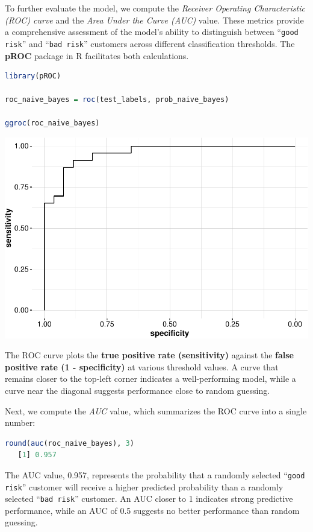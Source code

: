 \documentclass[
]{book}
\newcommand{\passthrough}[1]{#1}
\theoremstyle{definition}
\theoremstyle{definition}
\theoremstyle{definition}
\theoremstyle{definition}
\theoremstyle{remark}
\begin{document}
To further evaluate the model, we compute the \emph{Receiver Operating Characteristic (ROC) curve} and the \emph{Area Under the Curve (AUC)} value. These metrics provide a comprehensive assessment of the model's ability to distinguish between ``\passthrough{\lstinline!good risk!}'' and ``\passthrough{\lstinline!bad risk!}'' customers across different classification thresholds. The \textbf{pROC} package in R facilitates both calculations.

\begin{lstlisting}[language=R]
library(pROC)          

roc_naive_bayes = roc(test_labels, prob_naive_bayes)

ggroc(roc_naive_bayes)
\end{lstlisting}

\begin{center}\includegraphics[width=0.7\linewidth]{bayes_files/figure-latex/unnamed-chunk-17-1} \end{center}

The ROC curve plots the \textbf{true positive rate (sensitivity)} against the \textbf{false positive rate (1 - specificity)} at various threshold values. A curve that remains closer to the top-left corner indicates a well-performing model, while a curve near the diagonal suggests performance close to random guessing.

Next, we compute the \emph{AUC} value, which summarizes the ROC curve into a single number:

\begin{lstlisting}[language=R]
round(auc(roc_naive_bayes), 3)
   [1] 0.957
\end{lstlisting}

The AUC value, 0.957, represents the probability that a randomly selected ``\passthrough{\lstinline!good risk!}'' customer will receive a higher predicted probability than a randomly selected ``\passthrough{\lstinline!bad risk!}'' customer. An AUC closer to 1 indicates strong predictive performance, while an AUC of 0.5 suggests no better performance than random guessing.
\end{document}
